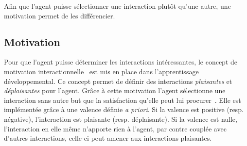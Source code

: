 \documentclass{llncs}
\begin{document}


Afin que l'agent puisse sélectionner une interaction plutôt qu'une autre, une motivation permet de les différencier. %
\subsection{Motivation}

Pour que l'agent puisse déterminer les interactions intéressantes, le concept de motivation interactionnelle~\cite{Liris-5870-interactional-motivation} est mis en place dans l'apprentissage développemental. Ce concept permet de définir des interactions \emph{plaisantes} et \emph{déplaisantes} pour l'agent. Grâce à cette motivation l'agent sélectionne une interaction sans autre but que la satisfaction qu'elle peut lui procurer~\cite{cognitiviste-interactionnel-steels2004autotelic}. Elle est implémentée grâce à une valence définie \textit{a priori}. Si la valence est positive (resp. négative), l'interaction est plaisante (resp. déplaisante). Si la valence est nulle, l'interaction en elle même n'apporte rien à l'agent, par contre couplée avec d'autres interactions, celle-ci peut amener aux interactions plaisantes. 
\end{document}
